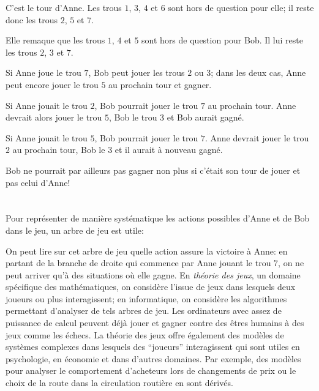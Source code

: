 {{{\centering%
\par}

C’est le tour d’Anne. Les trous $1$, $3$, $4$ et $6$ sont hors de question pour elle; il reste donc les trous $2$, $5$ et $7$.

{\centering%
\par}

Elle remaque que les trous $1$, $4$ et $5$ sont hors de question pour Bob. Il lui reste les trous $2$, $3$ et $7$.

Si Anne joue le trou $7$, Bob peut jouer les trous $2$ ou $3$; dans les deux cas, Anne peut encore jouer le trou $5$ au prochain tour et gagner.

Si Anne jouait le trou $2$, Bob pourrait jouer le trou $7$ au prochain tour. Anne devrait alors jouer le trou $5$, Bob le trou $3$ et Bob aurait gagné.

Si Anne jouait le trou $5$, Bob pourrait jouer le trou $7$. Anne devrait jouer le trou $2$ au prochain tour, Bob le $3$ et il aurait à nouveau gagné.

Bob ne pourrait par ailleurs pas gagner non plus si c’était son tour de jouer et pas celui d’Anne!



\section*{\BrochureItsInformatics}
Pour représenter de manière systématique les actions possibles d’Anne et de Bob dans le jeu, un arbre de jeu est utile:

{\centering%
\par}

On peut lire sur cet arbre de jeu quelle action assure la victoire à Anne: en partant de la branche de droite qui commence par Anne jouant le trou $7$, on ne peut arriver qu’à des situations où elle gagne. En \emph{théorie des jeux}, un domaine spécifique des mathématiques, on considère l’issue de jeux dans lesquels deux joueurs ou plus interagissent; en informatique, on considère les algorithmes permettant d’analyser de tels arbres de jeu. Les ordinateurs avec assez de puissance de calcul peuvent déjà jouer et gagner contre des êtres humains à des jeux comme les échecs. La théorie des jeux offre également des modèles de systèmes complexes dans lesquels des “joueurs” interagissent qui sont utiles en psychologie, en économie et dans d’autres domaines. Par exemple, des modèles pour analyser le comportement d’acheteurs lors de changements de prix ou le choix de la route dans la circulation routière en sont dérivés.

}}
